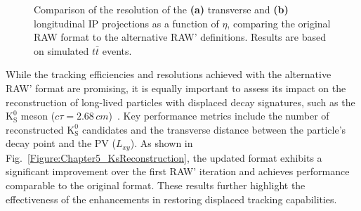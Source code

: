 \begin{figure}[h]
    \caption[Resolution of IP projections vs $\eta$ for RAW and RAW']{Comparison of the resolution of the \textbf{(a)} transverse and \textbf{(b)} longitudinal \ac{IP} projections as a function of $\eta$, comparing the original RAW format to the alternative RAW' definitions. Results are based on simulated $t\bar{t}$ events.}
    \label{Figure:Chapter5_ResolutionComparison}
\end{figure}

While the tracking efficiencies and resolutions achieved with the alternative RAW' format are promising, it is equally important to assess its impact on the reconstruction of long-lived particles with displaced decay signatures, such as the $\mathrm{K}_\mathrm{S}^0$ meson ($c\tau = 2.68\,\unit{cm}$)~\cite{ParticleMasses}. Key performance metrics include the number of reconstructed $\mathrm{K}_\mathrm{S}^0$ candidates and the transverse distance between the particle’s decay point and the \ac{PV} ($L_{xy}$). As shown in Fig.~\ref{Figure:Chapter5_KsReconstruction}, the updated format exhibits a significant improvement over the first RAW' iteration and achieves performance comparable to the original format. These results further highlight the effectiveness of the enhancements in restoring displaced tracking capabilities.

